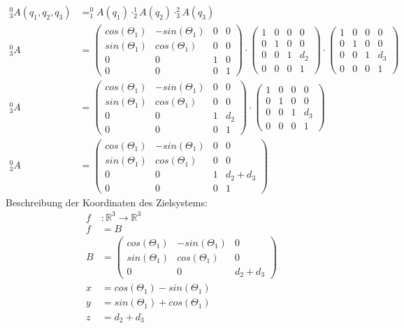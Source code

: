 \begin{align*}
^{0}_3 A(q_1, q_2, q_3) &= ^{0}_1 A(q_1) \cdot ^{1}_2 A(q_2) \cdot ^{2}_3 A(q_3) \\
^{0}_3 A &= \left( \begin{matrix} cos(\Theta_1) & -sin(\Theta_1) & 0 & 0 \\ sin(\Theta_1) & cos(\Theta_1) & 0 & 0 \\ 0 & 0 & 1 & 0 \\ 0 & 0 & 0 & 1\end{matrix} \right) \cdot \left( \begin{matrix} 1 & 0 & 0 & 0 \\ 0 & 1 & 0 & 0 \\ 0 & 0 & 1 & d_2 \\ 0 & 0 & 0 & 1\end{matrix} \right) \cdot \left( \begin{matrix} 1 & 0 & 0 & 0 \\ 0 & 1 & 0 & 0 \\ 0 & 0 & 1 & d_3 \\ 0 & 0 & 0 & 1\end{matrix} \right) \\
^{0}_3 A &= \left( \begin{matrix} cos(\Theta_1) & -sin(\Theta_1) & 0 & 0 \\ sin(\Theta_1) & cos(\Theta_1) & 0 & 0 \\ 0 & 0 & 1 & d_2 \\ 0 & 0 & 0 & 1\end{matrix} \right) \cdot \left( \begin{matrix} 1 & 0 & 0 & 0 \\ 0 & 1 & 0 & 0 \\ 0 & 0 & 1 & d_3 \\ 0 & 0 & 0 & 1\end{matrix} \right) \\
^{0}_3 A &= \left( \begin{matrix} cos(\Theta_1) & -sin(\Theta_1) & 0 & 0 \\ sin(\Theta_1) & cos(\Theta_1) & 0 & 0 \\ 0 & 0 & 1 & d_2 + d_3 \\ 0 & 0 & 0 & 1\end{matrix} \right)
\end{align*}
Beschreibung der Koordinaten des Zielsystems:
\begin{align*}
f &: \mathbb{R}^3 \longrightarrow \mathbb{R}^3 \\
f &= B \\
B &= \left( \begin{matrix} cos(\Theta_1) & -sin(\Theta_1) & 0 \\ sin(\Theta_1) & cos(\Theta_1) & 0 \\ 0 & 0 & d_2 + d_3 \end{matrix} \right) \\
x &= cos(\Theta_1) - sin(\Theta_1) \\
y &= sin(\Theta_1) + cos(\Theta_1) \\
z &= d_2 + d_3
\end{align*}


